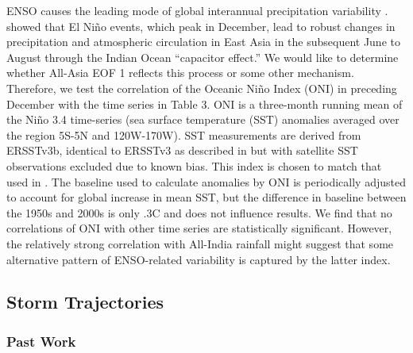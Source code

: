 \documentclass[12pt]{article}
\begin{document}
	ENSO causes the leading mode of global interannual precipitation variability \citep{Dai1997}. \cite{Xie2009} showed that El Ni\~no events, which peak in December, lead to robust changes in precipitation and atmospheric circulation in East Asia in the subsequent June to August through the Indian Ocean ``capacitor effect.'' We would like to determine whether All-Asia EOF 1 reflects this process or some other mechanism. Therefore, we test the correlation of the Oceanic Ni\~no Index (ONI) in preceding December with the time series in Table 3. ONI is a three-month running mean of the Ni\~no 3.4 time-series (sea surface temperature (SST) anomalies averaged over the region 5\textdegree S-5\textdegree N and 120\textdegree W-170\textdegree W). SST measurements are derived from ERSSTv3b, identical to ERSSTv3 as described in \cite{Smith2008} but with satellite SST observations excluded due to known bias. This index is chosen to match that used in \cite{Xie2009}. The baseline used to calculate anomalies by ONI is periodically adjusted to account for global increase in mean SST, but the difference in baseline between the 1950s and 2000s is only .3\textdegree C and does not influence results. We find that no correlations of ONI with other time series are statistically significant. However, the relatively strong correlation with All-India rainfall might suggest that some alternative pattern of ENSO-related variability is captured by the latter index.
			
\subsection{Storm Trajectories}

\subsubsection{Past Work}
	
\end{document}

